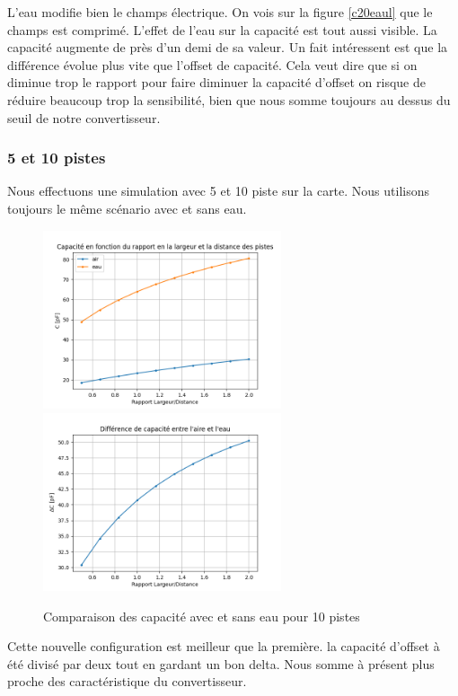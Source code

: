 L'eau modifie bien le champs électrique. On vois sur la figure \ref{c20eaul} que le champs est comprimé. L'effet de l'eau sur la capacité est tout aussi visible. La capacité augmente de près d'un demi de sa valeur. Un fait intéressent est que la différence évolue plus vite que l'offset de capacité. Cela veut dire que si on diminue trop le rapport pour faire diminuer la capacité d'offset on risque de réduire beaucoup trop la sensibilité, bien que nous somme toujours au dessus du seuil de notre convertisseur.

\subsubsection{5 et 10 pistes}
Nous effectuons une simulation avec 5 et 10 piste sur la carte. Nous utilisons toujours le même scénario avec et sans eau.


\begin{figure}[!ht]
 \centering
 \includegraphics[width=7cm]{C10Graph1.png}
 \includegraphics[width=7cm]{C10Graph2.png}
 \caption{Comparaison des capacité avec et sans eau pour 10 pistes}
\end{figure}

Cette nouvelle configuration est meilleur que la première. la capacité d'offset à été divisé par deux tout en gardant un bon delta. Nous somme à présent plus proche des caractéristique du convertisseur.

